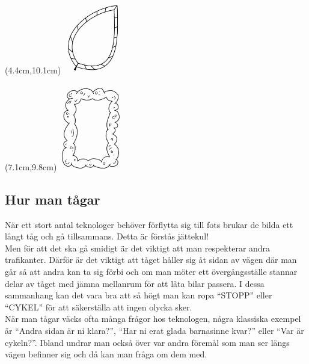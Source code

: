 \begin{textblock*}{6cm}(4.4cm,10.1cm) %
  \includegraphics[width=2.6cm]{./bilder/ramar/Ram9.png} %
\end{textblock*}

\begin{textblock*}{6cm}(7.1cm,9.8cm) %
  \includegraphics[width=2.8cm]{./bilder/ramar/Ram10.png} %
\end{textblock*}

\newpage
\resetBackground


\subsection*{Hur man tågar}

När ett stort antal teknologer behöver förflytta sig till fots brukar de bilda ett långt tåg och gå tillsammans.
Detta är förstås jättekul! 
\\

Men för att det ska gå smidigt är det viktigt att man respekterar andra trafikanter.
Därför är det viktigt att tåget håller sig åt sidan av vägen där man går så att andra kan ta sig förbi och om
man möter ett övergångsställe stannar delar av tåget med jämna mellanrum för att låta bilar passera. 
I dessa sammanhang kan det vara bra att så högt man kan ropa “STOPP” eller “CYKEL” för att säkerställa att ingen olycka sker.
\\

När man tågar väcks ofta många frågor hos teknologen, några klassiska exempel är “Andra sidan är ni klara?”,
“Har ni erat glada barnasinne kvar?” eller “Var är cykeln?”. Ibland undrar man också över var andra föremål
 som man ser längs vägen befinner sig och då kan man fråga om dem med.
\\

